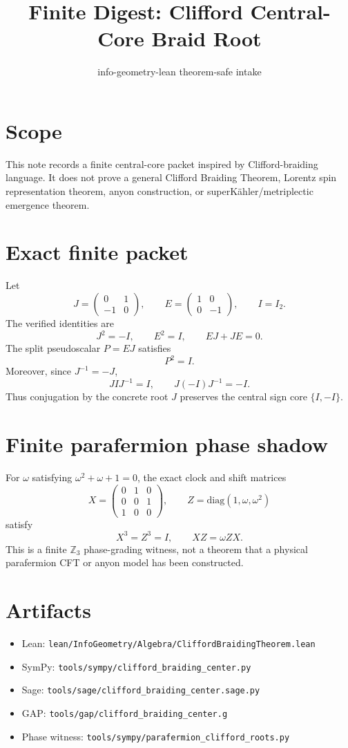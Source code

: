 \documentclass{article}
\title{Finite Digest: Clifford Central-Core Braid Root}
\author{info-geometry-lean theorem-safe intake}
\date{}
\begin{document}
\maketitle

\section{Scope}
This note records a finite central-core packet inspired by Clifford-braiding
language.  It does not prove a general Clifford Braiding Theorem, Lorentz spin
representation theorem, anyon construction, or superKähler/metriplectic
emergence theorem.

\section{Exact finite packet}
Let
\[
J=\begin{pmatrix}0&1\\-1&0\end{pmatrix},\qquad
E=\begin{pmatrix}1&0\\0&-1\end{pmatrix},\qquad I=I_2.
\]
The verified identities are
\[
J^2=-I,
\qquad E^2=I,
\qquad EJ+JE=0.
\]
The split pseudoscalar $P=EJ$ satisfies
\[
P^2=I.
\]
Moreover, since $J^{-1}=-J$,
\[
J I J^{-1}=I,
\qquad
J(-I)J^{-1}=-I.
\]
Thus conjugation by the concrete root $J$ preserves the central sign core
$\{I,-I\}$.

\section{Finite parafermion phase shadow}
For $\omega$ satisfying $\omega^2+\omega+1=0$, the exact clock and shift
matrices
\[
X=\begin{pmatrix}0&1&0\\0&0&1\\1&0&0\end{pmatrix},
\qquad
Z=\mathrm{diag}(1,\omega,\omega^2)
\]
satisfy
\[
X^3=Z^3=I,
\qquad XZ=\omega ZX.
\]
This is a finite $\mathbb Z_3$ phase-grading witness, not a theorem that a
physical parafermion CFT or anyon model has been constructed.

\section{Artifacts}
\begin{itemize}
\item Lean: \texttt{lean/InfoGeometry/Algebra/CliffordBraidingTheorem.lean}
\item SymPy: \texttt{tools/sympy/clifford\_braiding\_center.py}
\item Sage: \texttt{tools/sage/clifford\_braiding\_center.sage.py}
\item GAP: \texttt{tools/gap/clifford\_braiding\_center.g}
\item Phase witness: \texttt{tools/sympy/parafermion\_clifford\_roots.py}
\end{itemize}
\end{document}
